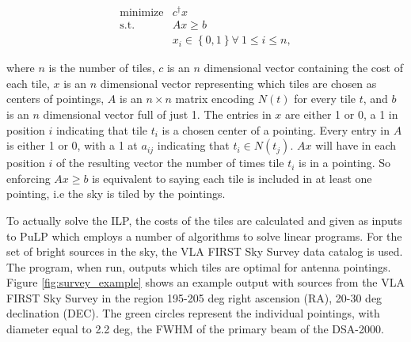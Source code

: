 \documentclass{article}
\begin{document}
\begin{multicols*}{2}
\begin{equation}
    \label{eq:lp}
    \begin{array}{cc}
        \mbox{minimize} & c^\dagger x\\
        \mbox{s.t.} & Ax \geq b\\
         & x_i \in \left\{0, 1 \right\} \forall\  1 \leq i \leq n,
    \end{array}
\end{equation}

where $n$ is the number of tiles, $c$ is an $n$ dimensional vector containing the cost of each tile, $x$ is an $n$ dimensional vector representing which tiles are chosen as centers of pointings, $A$ is an $n \times n$ matrix encoding $N(t)$ for every tile $t$, and $b$ is an $n$ dimensional vector full of just 1. The entries in $x$ are either 1 or 0, a 1 in position $i$ indicating that tile $t_i$ is a chosen center of a pointing. Every entry in $A$ is either 1 or 0, with a 1 at $a_{ij}$ indicating that $t_i \in N(t_j)$. $Ax$ will have in each position $i$ of the resulting vector  the number of times tile $t_i$ is in a pointing. So enforcing $Ax \geq b$ is equivalent to saying each tile is included in at least one pointing, i.e the sky is tiled by the pointings.

To actually solve the ILP, the costs of the tiles are calculated and given as inputs to PuLP\cite{pulp} which employs a number of algorithms to solve linear programs. For the set of bright sources in the sky, the VLA FIRST Sky Survey data catalog is used. The program, when run, outputs which tiles are optimal for antenna pointings. Figure \ref{fig:survey_example} shows an example output with sources from the VLA FIRST Sky Survey in the region 195-205 deg right ascension (RA), 20-30 deg declination (DEC). The green circles represent the individual pointings, with diameter equal to 2.2 deg, the FWHM of the primary beam of the DSA-2000.


\end{multicols*}
\end{document}
